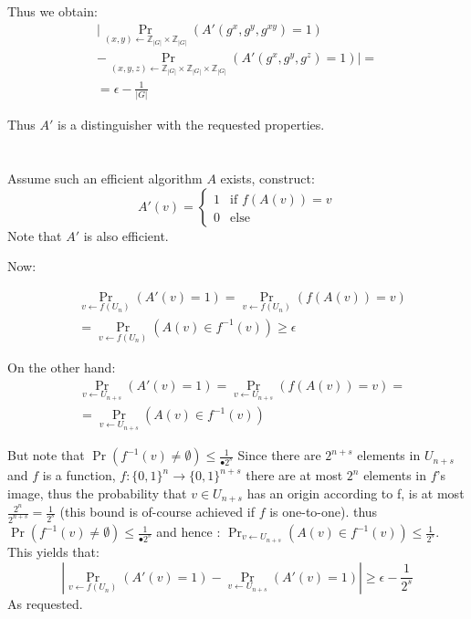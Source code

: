 \documentclass{article}
\begin{document}
Thus we obtain:
\begin{align*}
&|\Pr_{(x,y) \leftarrow  \mathbb{Z}_{|G|} \times \mathbb{Z}_{|G|}}(A'(g^x, g^y, g^{xy}) = 1)  &\\
&- \Pr_{ (x,y,z) \leftarrow  \mathbb{Z}_{|G|} \times \mathbb{Z}_{|G|} \times \mathbb{Z}_{|G|}}(A'(g^x, g^y, g^{z}) = 1)| =\\
&= \epsilon - \frac{1}{|G|}
\end{align*}

Thus $A'$ is a distinguisher with the requested properties.
\section{}
Assume such an efficient algorithm $A$ exists, construct:
\[A'(v) = 
\begin{cases}
	 1 &\mbox{if }  f(A(v)) = v \\ 
	 0 &\mbox{else}
\end{cases} \]
Note that $A'$ is also efficient.

Now: 

\begin{align*}
&\Pr_{ v \leftarrow f(U_n)}(A'(v) = 1) = \Pr_{ v \leftarrow f(U_n)}(f(A(v)) = v) \\
&= \Pr_{ v \leftarrow f(U_n)}(A(v) \in f^{-1}(v)) \geq \epsilon
\end{align*}

On the other hand:
\begin{align*}
&\Pr_{v \leftarrow U_{n+s}}(A'(v) = 1) = \Pr_{v \leftarrow U_{n+s}}(f(A(v)) = v) = \\
&= \Pr_{v \leftarrow U_{n+s}}(A(v) \in f^{-1}(v))
\end{align*}

But note that $\Pr(f^{-1}(v) \neq \emptyset) \leq  \frac{1}{•2^s}$
Since  there are $2^{n+s}$ elements in $U_{n+s}$  and $f$ is a function, $f:\{0,1\}^n  \rightarrow \{0,1\}^{n+s}$
there are at most $2^n$ elements in $f$'s image, thus the probability that $v \in U_{n+s}$ has an origin according to f,
is at most $\frac{2^n}{2^{n+s}} = \frac{1}{2^s}$ (this bound is of-course achieved if $f$ is one-to-one). thus $\Pr(f^{-1}(v) \neq \emptyset) \leq  \frac{1}{•2^s}$ and hence : $\Pr_{v \leftarrow U_{n+s}}(A(v) \in f^{-1}(v)) \leq \frac{1}{2^s}$.\\
This yields that: 
\[|\Pr_{v \leftarrow f(U_n)}(A'(v) = 1) - \Pr_{ v \leftarrow U_{n+s}}(A'(v) = 1) | \geq \epsilon - \frac{1}{2^s}\]
As requested.
\end{document}
